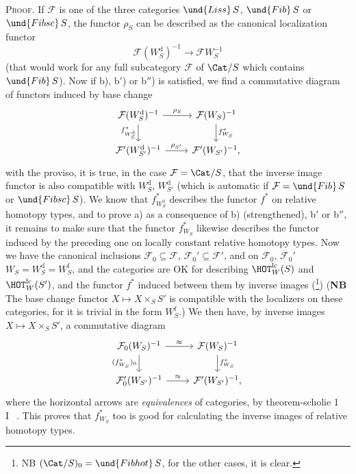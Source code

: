 \textsc{Proof.} If $\mathcal{F}$ is one of the three categories $\und{Liss}\,S$, $\und{Fib}\,S$ or $\und{Fibsc}\,S$, the functor $\rho_S$ can be described as the canonical localization functor
\[
\mathcal{F}(W_S^{\mathrm{d}})^{-1} \longrightarrow \mathcal{F}W_S^{-1}
\]
(that would work for any full subcategory $\mathcal{F}$ of $\Cat/S$ which contains $\und{Fib}\,S$). Now if b), b$'$) or b$''$) is satisfied, we find a commutative diagram of functors induced by base change
\[
\begin{tikzcd}
\mathcal{F}(W_S^{\mathrm{d}})^{-1} \arrow[r, "\rho_S"] \arrow[d, "f^*_{W_S^{\mathrm{d}}}"'] & \mathcal{F}(W_S)^{-1} \arrow[d, "f^*_{W_S}"] \\
\mathcal{F}'(W_{S'}^{\mathrm{d}})^{-1} \arrow[r, "\rho_{S'}"] & \mathcal{F}'(W_{S'})^{-1},
\end{tikzcd}
\]
with the proviso, it is true, in the case $\mathcal{F} = \Cat/S$, that the inverse image functor is also compatible with $W_S^{\mathrm{d}}$, $W_{S'}^{\mathrm{d}}$ (which is automatic if $\mathcal{F} = \und{Fib}\,S$ or $\und{Fibsc}\,S$). We know that $f^*_{W_S^{\mathrm{d}}}$ describes the functor $f^*$ on relative homotopy types, and to prove a) as a consequence
of b) (strengthened), b$'$ or b$''$, it remains to make sure that the functor $f^*_{W_S}$ likewise describes the functor induced by the preceding one on locally constant relative homotopy types. Now we have the canonical inclusions $\mathcal{F}_0 \subseteq \mathcal{F}$, $\mathcal{F}_0' \subseteq \mathcal{F}'$, and on $\mathcal{F}_0$, $\mathcal{F}_0'$ $W_S = W_S^{\mathrm{d}} = W_S^{\mathrm{f}}$, and the categories are OK for describing $\HOT_W^{\mathrm{lc}}(S)$ and $\HOT_W^{\mathrm{lc}}(S')$, and the functor $f^*$ induced between them by inverse images (\footnote[65]{NB $(\Cat/S)_0 = \und{Fibhot}\,S$, for the other cases, it is clear.}) (\textbf{NB} The base change functor $X \longmapsto X \times_S S'$ is compatible with the localizers on these categories, for it is trivial in the form $W_S^{\mathrm{f}}$.) We then have, by inverse images $X \longmapsto X \times_S S'$, a commutative diagram
\[
\begin{tikzcd}
\mathcal{F}_0(W_S)^{-1} \arrow[r, "\approx"] \arrow[d, "(f^*_{W_S})_0"'] & \mathcal{F}(W_S)^{-1} \arrow[d, "f^*_{W_S}"] \\
\mathcal{F}_0'(W_{S'})^{-1} \arrow[r, "\approx"] & \mathcal{F}'(W_{S'})^{-1},
\end{tikzcd}
\]
where the horizontal arrows are \textit{equivalences} of categories, by theorem-scholie 1 \textcircled{I}~. This proves that $f^*_{W_S}$ too is good for calculating the inverse images of relative homotopy types.

